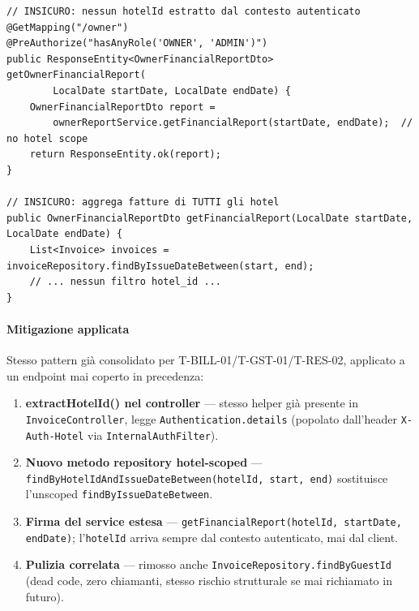 ﻿\documentclass[a4paper,12pt]{report}
\begin{document}
\begin{insecurebox}[title={Codice Vulnerabile --- OwnerReportController/ServiceImpl.java (baseline)}]
\begin{lstlisting}[style=java]
// INSICURO: nessun hotelId estratto dal contesto autenticato
@GetMapping("/owner")
@PreAuthorize("hasAnyRole('OWNER', 'ADMIN')")
public ResponseEntity<OwnerFinancialReportDto> getOwnerFinancialReport(
        LocalDate startDate, LocalDate endDate) {
    OwnerFinancialReportDto report =
        ownerReportService.getFinancialReport(startDate, endDate);  // no hotel scope
    return ResponseEntity.ok(report);
}

// INSICURO: aggrega fatture di TUTTI gli hotel
public OwnerFinancialReportDto getFinancialReport(LocalDate startDate, LocalDate endDate) {
    List<Invoice> invoices = invoiceRepository.findByIssueDateBetween(start, end);
    // ... nessun filtro hotel_id ...
}
\end{lstlisting}
\end{insecurebox}

\paragraph{Mitigazione applicata}
Stesso pattern già consolidato per T-BILL-01/T-GST-01/T-RES-02, applicato a un endpoint
mai coperto in precedenza:

\begin{enumerate}
    \item \textbf{extractHotelId() nel controller} --- stesso helper già presente in
          \texttt{InvoiceController}, legge \texttt{Authentication.details} (popolato
          dall'header \texttt{X-Auth-Hotel} via \texttt{InternalAuthFilter}).
    \item \textbf{Nuovo metodo repository hotel-scoped} ---
          \texttt{findByHotelIdAndIssueDateBetween(hotelId, start, end)} sostituisce
          l'unscoped \texttt{findByIssueDateBetween}.
    \item \textbf{Firma del service estesa} --- \texttt{getFinancialReport(hotelId,
          startDate, endDate)}; l'\texttt{hotelId} arriva sempre dal contesto
          autenticato, mai dal client.
    \item \textbf{Pulizia correlata} --- rimosso anche \texttt{InvoiceRepository.findByGuestId}
          (dead code, zero chiamanti, stesso rischio strutturale se mai richiamato in futuro).
\end{enumerate}
\end{document}
